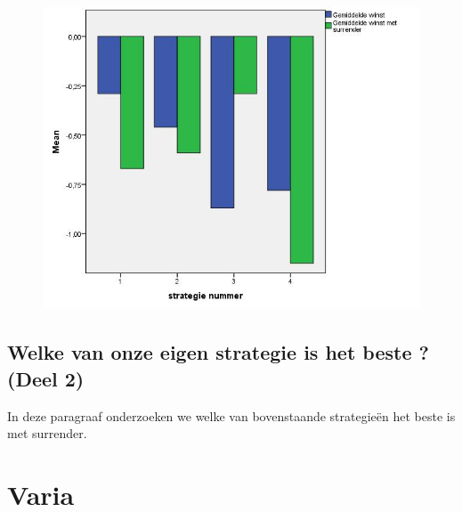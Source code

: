 \documentclass[conference]{IEEEtran}
\begin{document}
\begin{figure}
\centering
\includegraphics[width=0.7\linewidth]{OUTPUT1}
\caption{}
\label{fig:OUTPUT1}
\end{figure}




















\subsection{Welke van onze eigen strategie is het beste ? (Deel 2)}
In deze paragraaf onderzoeken we welke van bovenstaande strategieën het beste is met surrender.


\section{Varia}




\end{document}

